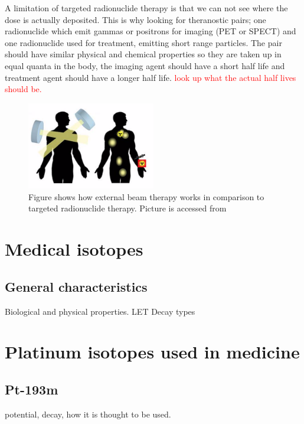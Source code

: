 \documentclass[a4paper,11pt,twoside]{book}
\begin{document}
A limitation of targeted radionuclide therapy is that we can not see where the dose is actually deposited. This is why looking for theranostic pairs; one radionuclide which emit gammas or positrons for imaging (PET or SPECT) and one radionuclide used for treatment, emitting short range particles. The pair should have similar physical and chemical properties so they are taken up in equal quanta in the body, the imaging agent should have a short half life and treatment agent should have a longer half life. \textcolor{red}{look up what the actual half lives should be.} 

\begin{figure}
    \centering
    \includegraphics[width=0.5\textwidth]{Theory/internal_vs_external.png}
    \caption{Figure shows how external beam therapy works in comparison to targeted radionuclide therapy. Picture is accessed from \cite{figure_internal_external}}
    \label{fig:interna_external}
\end{figure}


\section{Medical isotopes}

\subsection{General characteristics}
Biological and physical properties. 
LET
Decay types 





\section{Platinum isotopes used in medicine} 

\subsection{Pt-193m}
potential, decay, how it is thought to be used. 
\end{document}
